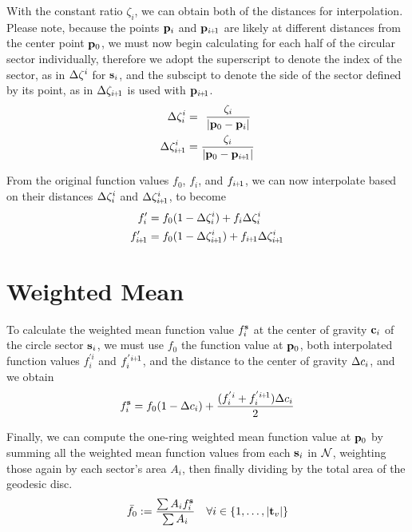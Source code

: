 With the constant ratio $\zeta_i$, we can obtain both of the distances for interpolation. Please note, because the points $\mathbf{p}_i$ and $\bp_{\sipo}$ are likely at different distances from the center point $\mathbf{p}_0$, we must now begin calculating for each half of the circular sector individually, therefore we adopt the superscript to denote the index of the sector, as in $\Delta\zeta^i$ for $\mathbf{s}_i$, and the subscipt to denote the side of the sector defined by its point, as in $\Dz_{\sipo}$ is used with $\bp_{\sipo}$.
\begin{align}
	\Dz^i_i & = \kern4pt\frac{\zeta_i}{|\bp_0 - \bp_i|}
	\label{eq:distanceIForInterpolation}\\
	\Dz^i_{\sipo} & = \frac{\zeta_i}{|\bp_0 - \bp_{\sipo}|}
	\label{eq:distanceIp1ForInterpolation}
\end{align}%
%

From the original function values $f_0$, $f_i$, and $f_{\sipo}$, we can now interpolate based on their distances $\Delta\zeta^i_i$ and $\Dz^i_{\sipo}$, to become
\begin{align}
	f'_i & = f_0(1 - \Dz^i_i) + f_i\Dz^i_i 
	\label{eq:interpolatedFi} \\
	f'_{\sipo} & = f_0(1 - \Dz^i_{\sipo}) + f_{\sipo}\Dz^i_{\sipo}
	\label{eq:interpolatedFip1}
\end{align}%
%
%
\section{Weighted Mean}
\label{cFONSsWM}
To calculate the weighted mean function value $f^{\mathbf{s}}_i$ at the center of gravity $\mathbf{c}_i$ of the circle sector $\mathbf{s}_i$, we must use $f_0$ the function value at $\mathbf{p}_0$, both interpolated function values $f^{'i}_i$ and $f^{'\sipo}_i$, and the distance to the center of gravity $\Delta c_i$, and we obtain
\begin{equation}
	f^\bs_i = f_0(1 - \Dc_i) + \frac{(f^{'i}_i + f^{'\sipo}_i)\Dc_i}{2}
	\label{eq:weightedMeanAtCoGatSector}
\end{equation}%
%

Finally, we can compute the one-ring weighted mean function value at $\mathbf{p}_0$ by summing all the weighted mean function values from each $\mathbf{s}_i$ in $\mathcal{N}$, weighting those again by each sector's area $A_i$, then finally dividing by the total area of the geodesic disc.
\begin{equation}
	\bar{f}_0 := \frac{\sum A_if^{\mathbf{s}}_i}{\sum A_i} \quad \forall i \in \{1,\ldots,|\mathbf{t}_v|\}
	\label{eq:meanFuncValAtP0}
\end{equation}%
%
%


